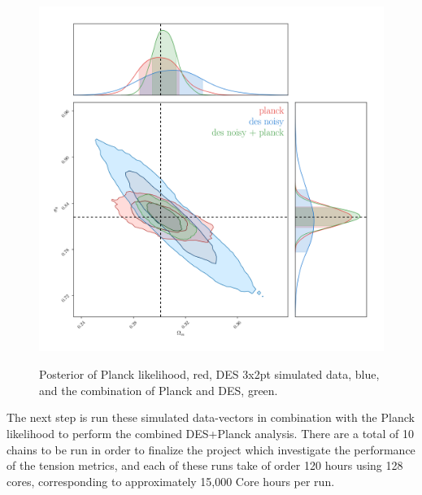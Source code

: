 \documentclass[12pt]{article}
\begin{document}
\begin{small}

\begin{figure}[h!]
\begin{center}
\includegraphics[height=12cm]{des+planck_poly2D.png}
\end{center}
 \caption{Posterior of Planck likelihood, red, DES 3x2pt simulated data, blue, and the combination of Planck and DES, green.}
\label{figure1}
\end{figure}

The next step is run these simulated data-vectors in combination with the Planck likelihood to perform the combined DES+Planck analysis. There are a total of 10 chains to be run in order to finalize the project which investigate the performance of the tension metrics, and each of these runs take of order 120 hours using 128 cores, corresponding to approximately 15,000 Core hours per run.


\end{small}
\end{document}
